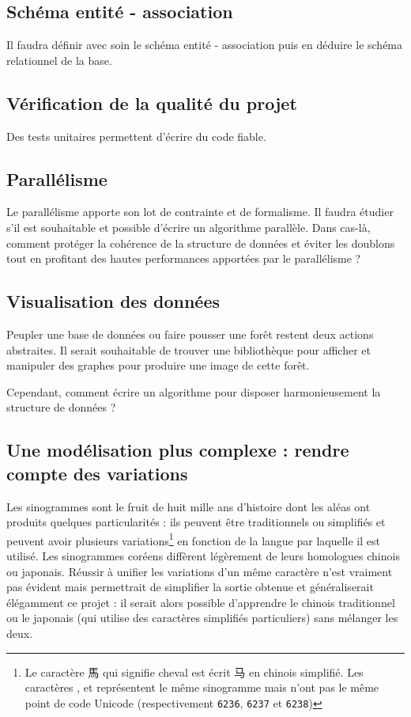 \documentclass[12pt,oneside]{article}
\begin{document}
\subsection{Schéma entité - association}

Il faudra définir avec soin le schéma entité - association puis en déduire le schéma relationnel de la base.

\subsection{Vérification de la qualité du projet}

Des tests unitaires permettent d'écrire du code fiable.

\subsection{Parallélisme}

Le parallélisme apporte son lot de contrainte et de formalisme. Il faudra étudier s'il est souhaitable et possible d'écrire un algorithme parallèle. Dans cas-là, comment protéger la cohérence de la structure de données et éviter les doublons tout en profitant des hautes performances apportées par le parallélisme ?

\subsection{Visualisation des données}

Peupler une base de données ou faire pousser une forêt restent deux actions abstraites. Il serait souhaitable de trouver une bibliothèque pour afficher et manipuler des graphes pour produire une image de cette forêt.

Cependant, comment écrire un algorithme pour disposer harmonieusement la structure de données ?

\subsection{Une modélisation plus complexe : rendre compte des variations}

Les sinogrammes sont le fruit de huit mille ans d'histoire dont les aléas ont produits quelques particularités : ils peuvent être traditionnels ou simplifiés et peuvent avoir plusieurs variations\footnote{Le caractère 馬 qui signifie cheval est écrit 马 en chinois simplifié. Les caractères ,  et  représentent le même sinogramme mais n'ont pas le même point de code Unicode (respectivement \texttt{6236}, \texttt{6237} et \texttt{6238})} en fonction de la langue par laquelle il est utilisé. Les \og sinogrammes \fg{} coréens diffèrent légèrement de leurs homologues chinois ou japonais. Réussir à unifier les variations d'un même caractère n'est vraiment pas évident mais permettrait de simplifier la sortie obtenue et généraliserait élégamment ce projet : il serait alors possible d'apprendre le chinois traditionnel ou le japonais (qui utilise des caractères simplifiés particuliers) sans mélanger les deux.
\end{document}
